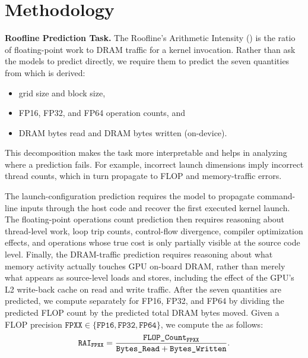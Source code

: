 
\section{Methodology}
\label{sec:methodology}


\textbf{Roofline Prediction Task.}
The Roofline's Arithmetic Intensity (\rai) is the ratio of floating-point work to DRAM traffic for a kernel invocation.
Rather than ask the models to predict \rai directly, we require them to predict the seven quantities from which \rai is derived:
\begin{itemize}
    \item grid size and block size,
    \item FP16, FP32, and FP64 operation counts, and
    \item DRAM bytes read and DRAM bytes written (on-device).
\end{itemize}
This decomposition makes the task more interpretable and helps in analyzing where a prediction fails.
For example, incorrect launch dimensions imply incorrect thread counts, which in turn propagate to FLOP and memory-traffic errors.

The launch-configuration prediction requires the model to propagate command-line inputs through the host code and recover the first executed kernel launch.
The floating-point operations count prediction then requires reasoning about thread-level work, loop trip counts, control-flow divergence, compiler optimization effects, and operations whose true cost is only partially visible at the source code level.
Finally, the DRAM-traffic prediction requires reasoning about what memory activity actually touches GPU on-board DRAM, rather than merely what appears as source-level loads and stores, including the effect of the GPU's L2 write-back cache on read and write traffic.
After the seven quantities are predicted, we compute \rai separately for FP16, FP32, and FP64 by dividing the predicted FLOP count by the predicted total DRAM bytes moved.
Given a FLOP precision $\texttt{FPXX} \in \{\texttt{FP16}, \texttt{FP32}, \texttt{FP64}\}$, we compute the \rai as follows:
\[
\texttt{RAI}_{\texttt{FPXX}} = \frac{\texttt{FLOP\_Count}_{\texttt{FPXX}}}{\texttt{Bytes\_Read} + \texttt{Bytes\_Written}}.
\]


